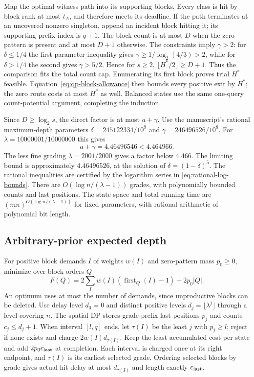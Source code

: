Map the optimal witness path into its supporting blocks. Every
class is hit by block rank at most $t_A$, and therefore meets its
deadline. If the path terminates at an uncovered nonzero singleton,
append an incident block hitting it; its supporting-prefix index
is $q+1$. The block count is at most $D$ when the zero pattern is
present and at most $D+1$ otherwise. The constraints imply
$\gamma>2$: for $\delta\le1/4$ the first parameter inequality
gives $\gamma\ge1/\log_2(4/3)>2$, while for $\delta>1/4$
the second gives $\gamma>5/2$. Hence for $s\ge2$,
$\lfloor H^*/2\rfloor\ge D+1$. Thus the comparison fits the total
count cap. Enumerating its first block proves trial $H^*$ feasible.
Equation~\eqref{eq:qp-block-allowance} then bounds every positive
exit by $H^*$; the zero route costs at most $H^*$ as well.
Balanced states use the same one-query count-potential argument,
completing the induction.

Since $D\ge\log_2s$, the direct factor is at most $a+\gamma$.
Use the manuscript's rational maximum-depth parameters
$\delta=245122334/10^9$ and $\gamma=246496526/10^8$.
For $\lambda=10000001/10000000$ this gives
\[
 a+\gamma=4.46496546<4.464966.
\]
The less fine grading $\lambda=2001/2000$ gives a factor below $4.466$.
The limiting bound is approximately $4.46496526$, at the solution of
$\delta=(1-\delta)^5$. The rational inequalities are certified by
the logarithm series in \eqref{eq:rational-log-bounds}.
There are $O(\log n/(\lambda-1))$ grades, with polynomially bounded
counts and last positions. The state space and total running time
are $(mn)^{O(\log n/(\lambda-1))}$ for fixed parameters, with
rational arithmetic of polynomial bit length.

\subsection{Arbitrary-prior expected depth}

For positive block demands $I$ of weights $w(I)$ and zero-pattern
mass $p_0\ge0$, minimize over block orders $Q$
\[
 F(Q)=2\sum_I w(I)(\operatorname{first}_Q(I)-1)+2p_0|Q|.
\]
An optimum uses at most the number of demands, since unproductive
blocks can be deleted. Use delay level $d_0=0$ and distinct positive
levels $d_j=\lfloor\lambda^j\rfloor$ through a level covering $n$.
The spatial DP stores grade-prefix last positions $p_j$ and counts
$c_j\le d_j+1$. When interval $[l,q]$ ends,
let $\tau(I)$ be the least $j$ with $p_j\ge l$; reject if none exists
and charge $2w(I)d_{\tau(I)}$. Keep the least accumulated cost per
state and add $2p_0c_{\rm last}$ at completion. Each interval is
charged once at its right endpoint, and $\tau(I)$ is its earliest
selected grade. Ordering selected blocks by grade gives actual hit
delay at most $d_{\tau(I)}$ and length exactly $c_{\rm last}$.

